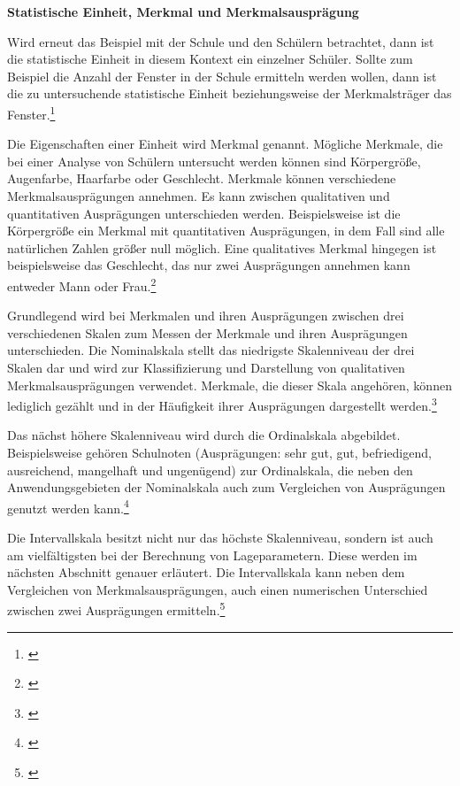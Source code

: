 \textbf{Statistische Einheit, Merkmal und Merkmalsausprägung}

Wird erneut das Beispiel mit der Schule und den Schülern betrachtet, dann ist die statistische Einheit in diesem Kontext ein einzelner Schüler. Sollte zum Beispiel die Anzahl der Fenster in der Schule ermitteln werden wollen, dann ist die zu untersuchende statistische Einheit beziehungsweise der Merkmalsträger das Fenster.\footnote{\cite[vgl.][13]{Statistik2016}}

Die Eigenschaften einer Einheit wird Merkmal genannt. Mögliche Merkmale, die bei einer Analyse von Schülern untersucht werden können sind Körpergröße, Augenfarbe, Haarfarbe oder Geschlecht. Merkmale können verschiedene Merkmalsausprägungen annehmen. Es kann zwischen qualitativen und quantitativen Ausprägungen unterschieden werden. Beispielsweise ist die Körpergröße ein Merkmal mit quantitativen Ausprägungen, in dem Fall sind alle natürlichen Zahlen größer null möglich. Eine qualitatives Merkmal hingegen ist beispielsweise das Geschlecht, das nur zwei Ausprägungen annehmen kann entweder Mann oder Frau.\footnote{\cite[vgl.][13\psqq]{Statistik2016}}

Grundlegend wird bei Merkmalen und ihren Ausprägungen zwischen drei verschiedenen Skalen zum Messen der Merkmale und ihren Ausprägungen unterschieden. Die Nominalskala stellt das niedrigste Skalenniveau der drei Skalen dar und wird zur Klassifizierung und Darstellung von qualitativen Merkmalsausprägungen verwendet. Merkmale, die dieser Skala angehören, können lediglich gezählt und in der Häufigkeit ihrer Ausprägungen dargestellt werden.\footnote{\cite[vgl.][15\psqq]{Statistik2016}}

Das nächst höhere Skalenniveau wird durch die Ordinalskala abgebildet. Beispielsweise gehören Schulnoten (Ausprägungen: sehr gut, gut, befriedigend, ausreichend, mangelhaft und ungenügend) zur Ordinalskala, die neben den Anwendungsgebieten der Nominalskala auch zum Vergleichen von Ausprägungen genutzt werden kann.\footnote{\cite[vgl.][15\psqq]{Statistik2016}}

Die Intervallskala besitzt nicht nur das höchste Skalenniveau, sondern ist auch am vielfältigsten bei der Berechnung von Lageparametern. Diese werden im nächsten Abschnitt genauer erläutert. Die Intervallskala kann neben dem Vergleichen von Merkmalsausprägungen, auch einen numerischen Unterschied zwischen zwei Ausprägungen ermitteln.\footnote{\cite[vgl.][15\psqq]{Statistik2016}}


